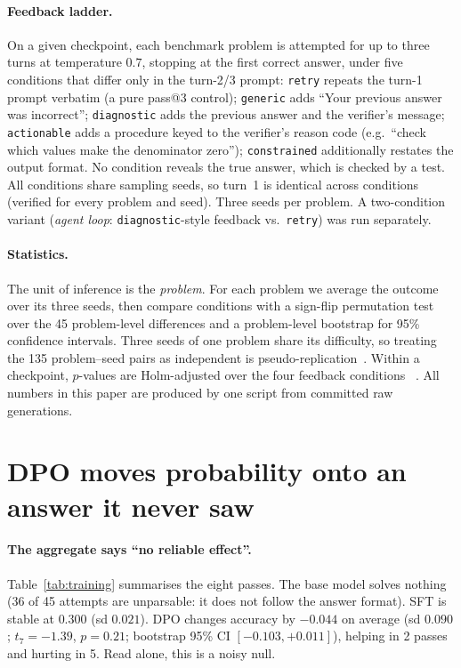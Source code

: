 \documentclass[10pt]{article}
\begin{document}
\paragraph{Feedback ladder.}
On a given checkpoint, each benchmark problem is attempted for up to three turns at
temperature $0.7$, stopping at the first correct answer, under five conditions that
differ only in the turn-2/3 prompt: \texttt{retry} repeats the turn-1 prompt
verbatim (a pure pass@3 control); \texttt{generic} adds ``Your previous answer was
incorrect''; \texttt{diagnostic} adds the previous answer and the verifier's message;
\texttt{actionable} adds a procedure keyed to the verifier's reason code (e.g.\ ``check
which values make the denominator zero''); \texttt{constrained} additionally restates
the output format. No condition reveals the true answer, which is checked by a test.
All conditions share sampling seeds, so turn~1 is identical across conditions (verified
for every problem and seed). Three seeds per problem. A two-condition variant
(\emph{agent loop}: \texttt{diagnostic}-style feedback vs.\ \texttt{retry}) was run
separately.

\paragraph{Statistics.}
The unit of inference is the \emph{problem}. For each problem we average the outcome
over its three seeds, then compare conditions with a sign-flip permutation test over
the 45 problem-level differences and a problem-level bootstrap for 95\% confidence
intervals. Three seeds of one problem share its difficulty, so treating the 135
problem--seed pairs as independent is pseudo-replication~\citep{hurlbert1984pseudoreplication}.
Within a checkpoint, $p$-values are Holm-adjusted over the four feedback conditions
~\citep{holm1979}. All numbers in this paper are produced by one script from committed
raw generations.

\section{DPO moves probability onto an answer it never saw}
\label{sec:dpo}



\paragraph{The aggregate says ``no reliable effect''.}
Table~\ref{tab:training} summarises the eight passes. The base model solves nothing
(36 of 45 attempts are unparsable: it does not follow the answer format). SFT is stable
at $0.300$ (sd $0.021$). DPO changes accuracy by $-0.044$ on average (sd $0.090$;
$t_7{=}{-}1.39$, $p{=}0.21$; bootstrap 95\% CI $[-0.103, +0.011]$), helping in 2 passes and
hurting in 5. Read alone, this is a noisy null.
\end{document}
